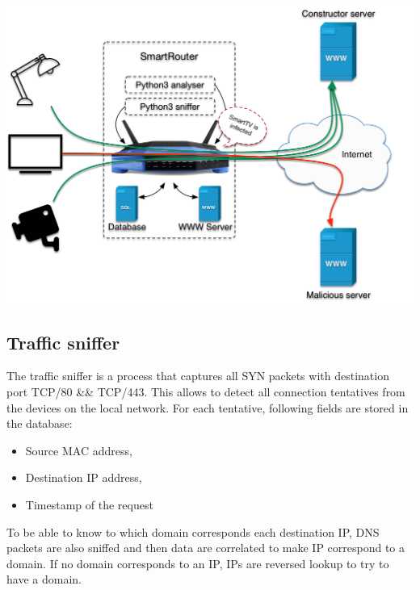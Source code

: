 \begin{frame}{}
\begin{multicols}{3}



\includegraphics[width=\linewidth]{Pictures/design.png}


\subsection{Traffic sniffer}

The traffic sniffer is a process that captures all SYN packets with destination port TCP/80 \&\& TCP/443. This allows to detect all connection tentatives from the devices on the local network. For each tentative, following fields are stored in the database:

\begin{itemize}
\item Source MAC address,
\item Destination IP address,
\item Timestamp of the request
\end{itemize}

To be able to know to which domain corresponds each destination IP, DNS packets are also sniffed and then data are correlated to make IP correspond to a domain. If no domain corresponds to an IP, IPs are reversed lookup to try to have a domain.


\end{multicols}
\end{frame}
